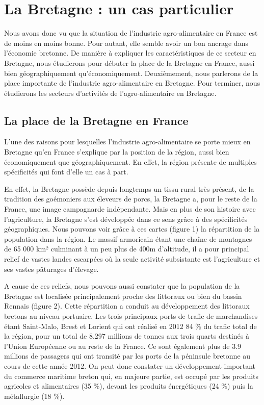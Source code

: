 \documentclass[a4paper,10pt]{report}
\begin{document}
	\section{La Bretagne : un cas particulier}
	Nous avons donc vu que la situation de l’industrie agro-alimentaire en France est de moins en moins bonne. Pour autant, elle semble avoir un bon ancrage dans l’économie bretonne. De manière à expliquer les caractéristiques de ce secteur en Bretagne, nous étudierons pour débuter la place de la Bretagne en France, aussi bien géographiquement qu’économiquement. Deuxièmement, nous parlerons de la place importante de l’industrie agro-alimentaire en Bretagne. Pour terminer, nous étudierons les secteurs d’activités de l’agro-alimentaire en Bretagne.

		\subsection{La place de la Bretagne en France}
			L’une des raisons pour lesquelles l’industrie agro-alimentaire se porte mieux en Bretagne qu’en France s’explique par la position de la région, aussi bien économiquement que géographiquement. En effet, la région présente de multiples spécificités qui font d’elle un cas à part.
			
			En effet, la Bretagne possède depuis longtemps un tissu rural très présent, de la tradition des goémoniers aux éleveurs de porcs, la Bretagne a, pour le reste de la France, une image campagnarde indépendante. Mais en plus de son histoire avec l’agriculture, la Bretagne s’est développée dans ce sens grâce à des spécificités géographiques. Nous pouvons voir grâce à ces cartes (figure 1) la répartition de la population dans la région. Le massif armoricain étant une chaîne de montagnes de 65 000 km² culminant à un peu plus de 400m d’altitude, il a pour principal relief de vastes landes escarpées où la seule activité subsistante est l’agriculture et ses vastes pâturages d’élevage.
			
			A cause de ces reliefs, nous pouvons aussi constater que la population de la Bretagne est localisée principalement proche des littoraux ou bien du bassin Rennais (figure 2). Cette répartition a conduit au développement des littoraux bretons au niveau portuaire. Les trois principaux ports de trafic de marchandises étant Saint-Malo, Brest et Lorient qui ont réalisé en 2012 84 \% du trafic total de la région, pour un total de 8.297 millions de tonnes aux trois quarts destinés à l’Union Européenne ou au reste de la France. Ce sont également plus de 3.9 millions de passagers qui ont transité par les ports de la péninsule bretonne au cours de cette année 2012\cite{CommerceMaritimeBretagne}. On peut donc constater un développement important du commerce maritime breton qui, en majeure partie, est occupé par les produits agricoles et alimentaires (35 \%), devant les produits énergétiques (24 \%) puis la métallurgie (18 \%).
			
\end{document}
